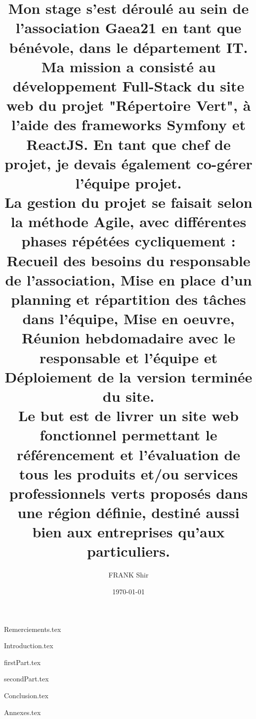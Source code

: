 \documentclass{rUTT}
\title{Mon stage s'est déroulé au sein de l'association Gaea21 en tant que bénévole, dans le département IT. \\
Ma mission a consisté au développement Full-Stack du site web du projet "Répertoire Vert", à l'aide des frameworks Symfony et ReactJS. En tant que chef de projet, je devais également co-gérer l'équipe projet.
\\ La gestion du projet se faisait selon la méthode Agile, avec différentes phases répétées cycliquement : \\
Recueil des besoins du responsable de l'association, Mise en place d'un planning et répartition des tâches dans l'équipe, Mise en oeuvre, Réunion hebdomadaire avec le responsable et l'équipe et Déploiement de la version terminée du site.
\\ Le but est de livrer un site web fonctionnel permettant le référencement et l’évaluation de tous les
produits et/ou services professionnels verts proposés
dans une région définie, destiné aussi bien aux entreprises qu'aux particuliers.}
\date{\today} %
\author{{\sc FRANK} Shir
}
\begin{document}
    \frontpageSTB %

    \myemptypage %

    \justify %


    {Remerciements.tex} %

    \clearpage


    \clearpage


    {Introduction.tex}

    \clearpage

    {firstPart.tex}

    \clearpage

    {secondPart.tex}





    \clearpage


    {Conclusion.tex}

    \clearpage


    {
    \raggedright %
    \sloppy
    \nocite{*} %
    \printbibliography[title={Bibliographie},heading=bibintoc]

    \clearpage
    \listoffigures
    \listoftables
    }
    \clearpage


    {Annexes.tex}

    \clearpage

    

    \clearpage
    \myemptypage
\end{document}
